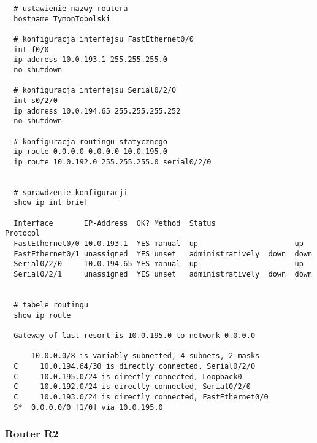 \documentclass[wide,a4paper,titlepage,12pt] {article}
\begin{document}
  \begin{verbatim}
  # ustawienie nazwy routera
  hostname TymonTobolski

  # konfiguracja interfejsu FastEthernet0/0
  int f0/0
  ip address 10.0.193.1 255.255.255.0
  no shutdown

  # konfiguracja interfejsu Serial0/2/0
  int s0/2/0
  ip address 10.0.194.65 255.255.255.252
  no shutdown

  # konfiguracja routingu statycznego
  ip route 0.0.0.0 0.0.0.0 10.0.195.0
  ip route 10.0.192.0 255.255.255.0 serial0/2/0


  # sprawdzenie konfiguracji
  show ip int brief

  Interface       IP-Address  OK? Method  Status                  Protocol
  FastEthernet0/0 10.0.193.1  YES manual  up                      up
  FastEthernet0/1 unassigned  YES unset   administratively  down  down
  Serial0/2/0     10.0.194.65 YES manual  up                      up
  Serial0/2/1     unassigned  YES unset   administratively  down  down


  # tabele routingu
  show ip route

  Gateway of last resort is 10.0.195.0 to network 0.0.0.0

      10.0.0.0/8 is variably subnetted, 4 subnets, 2 masks
  C     10.0.194.64/30 is directly connected. Serial0/2/0
  C     10.0.195.0/24 is directly connected, Loopback0
  C     10.0.192.0/24 is directly connected, Serial0/2/0
  C     10.0.193.0/24 is directly connected, FastEthernet0/0
  S*  0.0.0.0/0 [1/0] via 10.0.195.0
 \end{verbatim}

  \subsubsection{Router R2}
\end{document}
